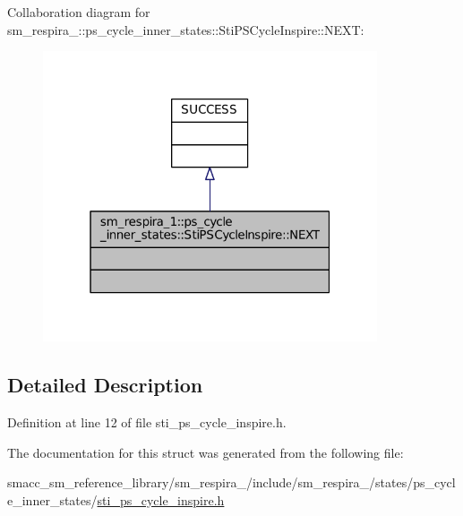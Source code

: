 Collaboration diagram for sm\+\_\+respira\+\_\+:\+:ps\+\_\+cycle\+\_\+inner\+\_\+states\+:\+:Sti\+P\+S\+Cycle\+Inspire\+:\+:N\+E\+XT\+:
\nopagebreak
\begin{figure}[H]
\begin{center}
\leavevmode
\includegraphics[width=280pt]{structsm__respira__1_1_1ps__cycle__inner__states_1_1StiPSCycleInspire_1_1NEXT__coll__graph}
\end{center}
\end{figure}


\subsection{Detailed Description}


Definition at line 12 of file sti\+\_\+ps\+\_\+cycle\+\_\+inspire.\+h.



The documentation for this struct was generated from the following file\+:\begin{DoxyCompactItemize}
\item 
smacc\+\_\+sm\+\_\+reference\+\_\+library/sm\+\_\+respira\+\_/include/sm\+\_\+respira\+\_/states/ps\+\_\+cycle\+\_\+inner\+\_\+states/\hyperlink{sti__ps__cycle__inspire_8h}{sti\+\_\+ps\+\_\+cycle\+\_\+inspire.\+h}\end{DoxyCompactItemize}
